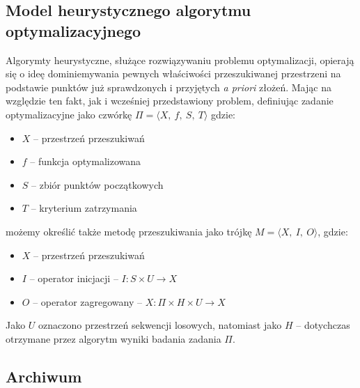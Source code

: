 \documentclass[11pt,a4paper]{report}
\begin{document}
{\subsection{Model heurystycznego algorytmu optymalizacyjnego}
\par{
Algorymty heurystyczne, służące rozwiązywaniu problemu optymalizacji, opierają się o ideę dominiemywania pewnych właściwości przeszukiwanej przestrzeni na podstawie punktów już sprawdzonych i przyjętych \emph{a priori} złożeń. Mając na względzie ten fakt, jak i wcześniej przedstawiony problem, definiując \cite{SearchingInteligent} zadanie optymalizacyjne jako czwórkę $\Pi = \langle{}X,~f,~S,~T\rangle$ gdzie:
\begin{itemize}
\item $X$ -- przestrzeń przeszukiwań
\item $f$ -- funkcja optymalizowana
\item $S$ -- zbiór punktów początkowych 
\item $T$ -- kryterium zatrzymania
\end{itemize}
możemy określić także metodę przeszukiwania jako \cite{SearchingInteligent} trójkę $M = \langle{}X,~I,~O\rangle$, gdzie:
\begin{itemize}
\item $X$ -- przestrzeń przeszukiwań 
\item $I$ -- operator inicjacji -- $I: S \times U \rightarrow X$
\item $O$ -- operator zagregowany -- $X: \Pi \times H \times U \rightarrow X$
\end{itemize}
Jako $U$ oznaczono przestrzeń sekwencji losowych, natomiast jako $H$ -- dotychczas otrzymane przez algorytm wyniki badania zadania $\Pi$.
}
\subsection{Archiwum}

}
\end{document}
